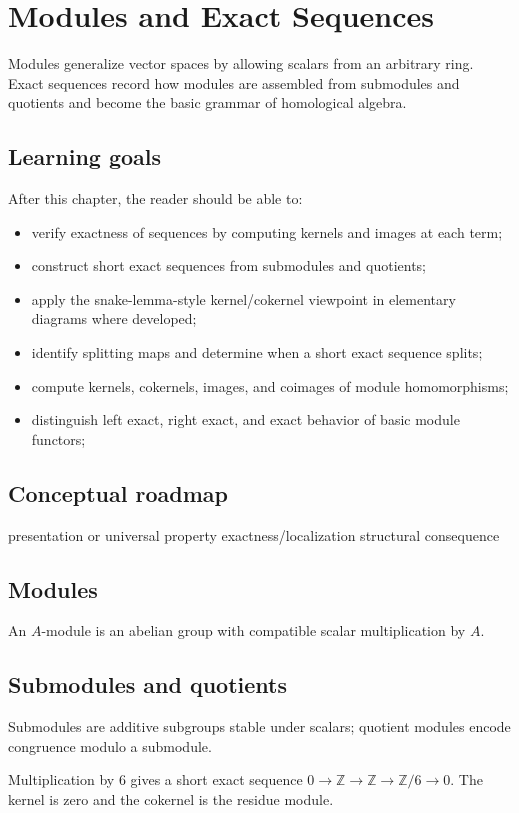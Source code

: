 \chapter{Modules and Exact Sequences}
\label{ch:v09}

Modules generalize vector spaces by allowing scalars from an arbitrary ring. Exact sequences record how modules are assembled from submodules and quotients and become the basic grammar of homological algebra.

\section*{Learning goals}
After this chapter, the reader should be able to:
\begin{itemize}
\item verify exactness of sequences by computing kernels and images at each term;
\item construct short exact sequences from submodules and quotients;
\item apply the snake-lemma-style kernel/cokernel viewpoint in elementary diagrams where developed;
\item identify splitting maps and determine when a short exact sequence splits;
\item compute kernels, cokernels, images, and coimages of module homomorphisms;
\item distinguish left exact, right exact, and exact behavior of basic module functors;
\end{itemize}
\section*{Conceptual roadmap}
\volroadmap
  {presentation or universal property}
  {exactness/localization}
  {structural consequence}

\section{Modules}
An $A$-module is an abelian group with compatible scalar multiplication by $A$.

\section{Submodules and quotients}
Submodules are additive subgroups stable under scalars; quotient modules encode congruence modulo a submodule.

\begin{example}\label{ex:v09-expand-01}
Multiplication by $6$ gives a short exact sequence $0\to\mathbb Z\to\mathbb Z\to\mathbb Z/6\to0$. The kernel is zero and the cokernel is the residue module.
\end{example}
